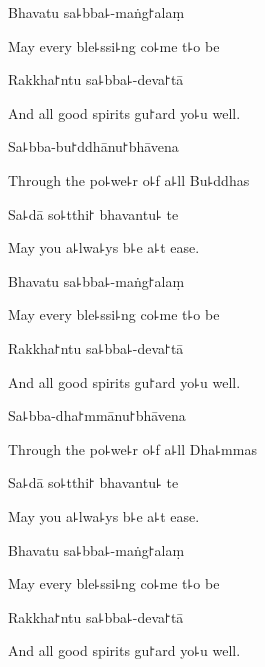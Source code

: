 Bhavatu sa꜕bba꜕-maṅg꜓alaṃ

\begin{english}
  May every ble꜕ssi꜕ng co꜕me t꜕o be
\end{english}

Rakkha꜓ntu sa꜕bba꜕-deva꜓tā

\begin{english}
  And all good spirits gu꜓ard yo꜕u well.
\end{english}

\enlargethispage{2\baselineskip}

Sa꜕bba-bu꜓ddhānu꜓bhāvena

\begin{english}
  Through the po꜕we꜕r o꜕f a꜕ll Bu꜕ddhas
\end{english}

Sa꜕dā so꜕tthi꜓ bhavantu꜕ te

\begin{english}
  May you a꜕lwa꜕ys b꜕e a꜕t ease.
\end{english}

Bhavatu sa꜕bba꜕-maṅg꜓alaṃ

\begin{english}
  May every ble꜕ssi꜕ng co꜕me t꜕o be
\end{english}

Rakkha꜓ntu sa꜕bba꜕-deva꜓tā

\begin{english}
  And all good spirits gu꜓ard yo꜕u well.
\end{english}

Sa꜕bba-dha꜓mmānu꜓bhāvena

\begin{english}
  Through the po꜕we꜕r o꜕f a꜕ll Dha꜕mmas
\end{english}

Sa꜕dā so꜕tthi꜓ bhavantu꜕ te

\begin{english}
  May you a꜕lwa꜕ys b꜕e a꜕t ease.
\end{english}

Bhavatu sa꜕bba꜕-maṅg꜓alaṃ

\begin{english}
  May every ble꜕ssi꜕ng co꜕me t꜕o be
\end{english}

Rakkha꜓ntu sa꜕bba꜕-deva꜓tā

\begin{english}
  And all good spirits gu꜓ard yo꜕u well.
\end{english}

